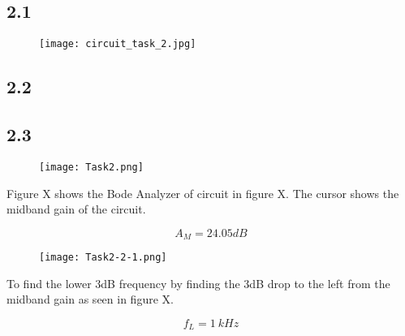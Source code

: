 \subsection*{2.1}

    \begin{figure}[h!]
        \centering
        \texttt{[image: circuit\_task\_2.jpg]}
    \end{figure}

\subsection*{2.2}



\subsection*{2.3}
	\begin{figure}[h!]
	    \centering
	    \texttt{[image: Task2.png]}
	\end{figure}

	Figure X shows the Bode Analyzer of circuit in figure X. The cursor shows the midband gain of the circuit.

	$$ A_{M} = 24.05 dB $$ 

\pagebreak
    \begin{figure}[h]
        \centering
        \texttt{[image: Task2-2-1.png]}
    \end{figure}

	To find the lower 3dB frequency by finding the 3dB drop to the left from the midband gain 	as seen in figure X.

	$$ f_{L} = 1 \ k Hz $$

